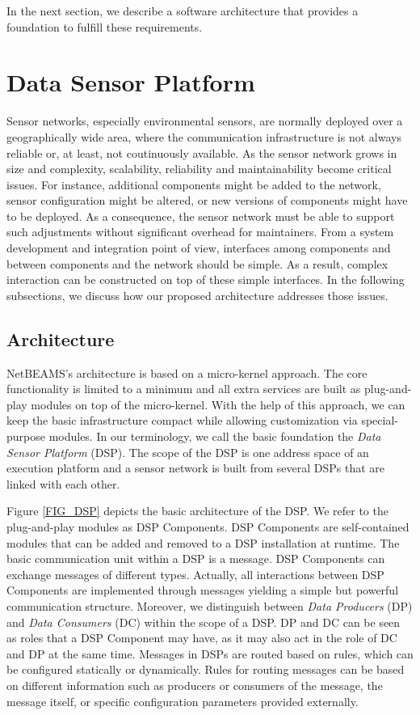 \documentclass[conference]{IEEEtran}
\begin{document}
In the next section, we describe a software architecture that provides
a foundation to fulfill these requirements.


\section{Data Sensor Platform}
\label{SEC_DSP}

Sensor networks, especially environmental sensors, are normally
deployed over a geographically wide area, where the communication
infrastructure is not always reliable or, at least, not coutinuously
available. As the sensor network grows in size and complexity, 
scalability, reliability and maintainability become critical issues.
For instance, additional components might be added to the network, sensor
configuration might be altered, or new versions of components might have to be
deployed. As a consequence, the sensor network must be able to support such
adjustments without significant overhead for maintainers.  From a system
development and integration point of view, interfaces among components
and between components and the network should be simple. As a result, complex
interaction can be constructed on top of these simple interfaces. In
the following subsections, we discuss how our proposed architecture addresses
those issues.

\subsection{Architecture}

NetBEAMS's architecture is based on a micro-kernel approach. The core
functionality is limited to a minimum and all extra services are built
as plug-and-play modules on top of the micro-kernel. With the help of
this approach, we can keep the basic infrastructure compact while
allowing customization via special-purpose modules. In our terminology,
we call the basic foundation the \emph{Data Sensor Platform}
(DSP). The scope of the DSP is one address space of an execution
platform and a sensor network is built from several DSPs that are linked
with each other.

Figure \ref{FIG_DSP} depicts the basic architecture of the DSP. We
refer to the plug-and-play modules as DSP Components. DSP Components
are self-contained modules that can be added and removed to a DSP
installation at runtime. The basic communication unit within a DSP
is a message. DSP Components can exchange messages of different types.
Actually, all interactions between DSP Components are implemented
through messages yielding a simple but powerful communication
structure. Moreover, we distinguish between \emph{Data Producers} (DP) and
\emph{Data Consumers} (DC) within the scope of a DSP. DP and DC can be
seen as roles that a DSP Component may have, as it may also 
act in the role of DC and DP at the same time. Messages
in DSPs are routed based on rules, which can be configured statically
or dynamically. Rules for routing messages can be based on different
information such as producers or consumers of the message, the message
itself, or specific configuration parameters provided externally.
\end{document}
